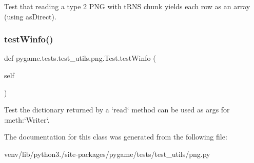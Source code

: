 \begin{DoxyVerb}Test that reading a type 2 PNG with tRNS chunk yields each
row as an array (using asDirect).\end{DoxyVerb}
 \mbox{\label{classpygame_1_1tests_1_1test__utils_1_1png_1_1_test_a03715fabf2188ac3c3bcbbdd6d0dadc6}} 
\subsubsection{\texorpdfstring{test\+Winfo()}{testWinfo()}}
{\footnotesize\ttfamily def pygame.\+tests.\+test\+\_\+utils.\+png.\+Test.\+test\+Winfo (\begin{DoxyParamCaption}\item[{}]{self }\end{DoxyParamCaption})}

\begin{DoxyVerb}Test the dictionary returned by a `read` method can be used
as args for :meth:`Writer`.
\end{DoxyVerb}
 

The documentation for this class was generated from the following file\+:\begin{DoxyCompactItemize}
\item 
venv/lib/python3./site-\/packages/pygame/tests/test\+\_\+utils/png.\+py\end{DoxyCompactItemize}
